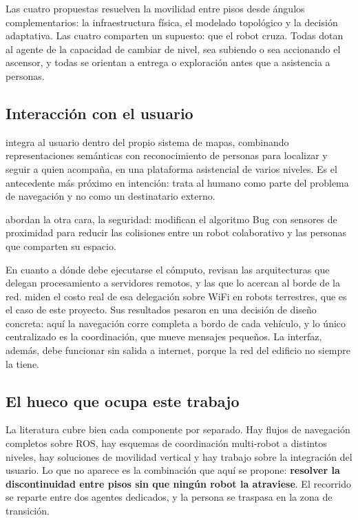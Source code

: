 Las cuatro propuestas resuelven la movilidad entre pisos desde ángulos
complementarios: la infraestructura física, el modelado topológico y la decisión
adaptativa. Las cuatro comparten un supuesto: que el robot cruza. Todas dotan al
agente de la capacidad de cambiar de nivel, sea subiendo o sea accionando el
ascensor, y todas se orientan a entrega o exploración antes que a asistencia a
personas.

\subsection{Interacción con el usuario}

\textcite{jimenez2024arquitectura} integra al usuario dentro del propio sistema
de mapas, combinando representaciones semánticas con reconocimiento de personas
para localizar y seguir a quien acompaña, en una plataforma asistencial de varios
niveles. Es el antecedente más próximo en intención: trata al humano como parte
del problema de navegación y no como un destinatario externo.

\textcite{li2023bug} abordan la otra cara, la seguridad: modifican el algoritmo
Bug con sensores de proximidad para reducir las colisiones entre un robot
colaborativo y las personas que comparten su espacio.

En cuanto a dónde debe ejecutarse el cómputo, \textcite{kehoe2015cloud} revisan
las arquitecturas que delegan procesamiento a servidores remotos, y
\textcite{tahir2025edge} las que lo acercan al borde de la red.
\textcite{malavolta2023offloading} miden el costo real de esa delegación sobre
WiFi en robots terrestres, que es el caso de este proyecto. Sus resultados
pesaron en una decisión de diseño concreta: aquí la navegación corre completa a
bordo de cada vehículo, y lo único centralizado es la coordinación, que mueve
mensajes pequeños. La interfaz, además, debe funcionar sin salida a internet,
porque la red del edificio no siempre la tiene.

\subsection{El hueco que ocupa este trabajo}

La literatura cubre bien cada componente por separado. Hay flujos de navegación
completos sobre ROS, hay esquemas de coordinación multi-robot a distintos
niveles, hay soluciones de movilidad vertical y hay trabajo sobre la integración
del usuario. Lo que no aparece es la combinación que aquí se propone:
\textbf{resolver la discontinuidad entre pisos sin que ningún robot la
atraviese}. El recorrido se reparte entre dos agentes dedicados, y la persona se
traspasa en la zona de transición.

